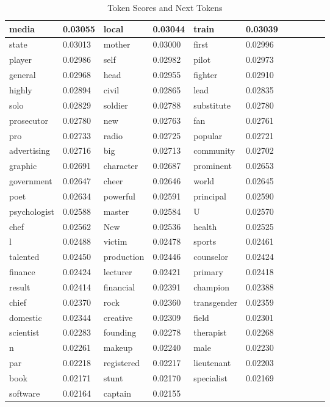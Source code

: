 \begin{table}[h]
\begin{tabular}{|l|l|l|l|l|l|}
 media & 0.03055 &  local & 0.03044 &  train & 0.03039 & & & & & & \\ \hline
 state & 0.03013 &  mother & 0.03000 &  first & 0.02996 & & & & & & \\ \hline
 player & 0.02986 &  self & 0.02982 &  pilot & 0.02973 & & & & & & \\ \hline
 general & 0.02968 &  head & 0.02955 &  fighter & 0.02910 & & & & & & \\ \hline
 highly & 0.02894 &  civil & 0.02865 &  lead & 0.02835 & & & & & & \\ \hline
 solo & 0.02829 &  soldier & 0.02788 &  substitute & 0.02780 & & & & & & \\ \hline
 prosecutor & 0.02780 &  new & 0.02763 &  fan & 0.02761 & & & & & & \\ \hline
 pro & 0.02733 &  radio & 0.02725 &  popular & 0.02721 & & & & & & \\ \hline
 advertising & 0.02716 &  big & 0.02713 &  community & 0.02702 & & & & & & \\ \hline
 graphic & 0.02691 &  character & 0.02687 &  prominent & 0.02653 & & & & & & \\ \hline
 government & 0.02647 &  cheer & 0.02646 &  world & 0.02645 & & & & & & \\ \hline
 poet & 0.02634 &  powerful & 0.02591 &  principal & 0.02590 & & & & & & \\ \hline
 psychologist & 0.02588 &  master & 0.02584 &  U & 0.02570 & & & & & & \\ \hline
 chef & 0.02562 &  New & 0.02536 &  health & 0.02525 & & & & & & \\ \hline
 l & 0.02488 &  victim & 0.02478 &  sports & 0.02461 & & & & & & \\ \hline
 talented & 0.02450 &  production & 0.02446 &  counselor & 0.02424 & & & & & & \\ \hline
 finance & 0.02424 &  lecturer & 0.02421 &  primary & 0.02418 & & & & & & \\ \hline
 result & 0.02414 &  financial & 0.02391 &  champion & 0.02388 & & & & & & \\ \hline
 chief & 0.02370 &  rock & 0.02360 &  transgender & 0.02359 & & & & & & \\ \hline
 domestic & 0.02344 &  creative & 0.02309 &  field & 0.02301 & & & & & & \\ \hline
 scientist & 0.02283 &  founding & 0.02278 &  therapist & 0.02268 & & & & & & \\ \hline
 n & 0.02261 &  makeup & 0.02240 &  male & 0.02230 & & & & & & \\ \hline
 par & 0.02218 &  registered & 0.02217 &  lieutenant & 0.02203 & & & & & & \\ \hline
 book & 0.02171 &  stunt & 0.02170 &  specialist & 0.02169 & & & & & & \\ \hline
 software & 0.02164 &  captain & 0.02155 & & & & & & & & \\ \hline
\end{tabular}
\caption{Token Scores and Next Tokens}
\end{table}